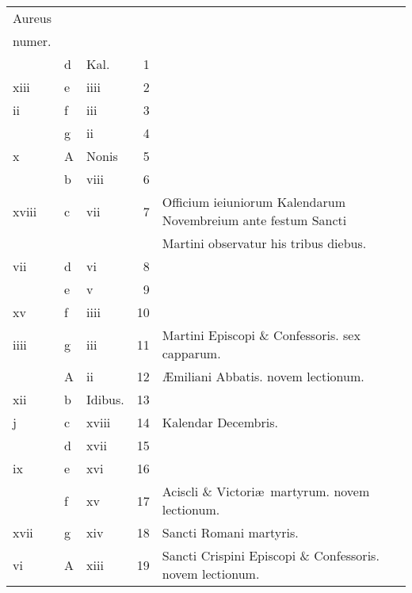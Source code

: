 \documentclass[11pt,openany]{book}
\begin{document}
\begin{center}
\begin{tabular}{l | l | l | r | l r}
\color{Red}Aureus & & & & \color{Red} \\
\color{Red}numer. & & & & \color{Red} \\
\color{Red}  & d & \color{Red} Kal. & 1 & & \color{Red} \\
\color{Red} xiii & e & \color{Red} iiii & 2 & & \color{Red} \\
\color{Red} ii & f & \color{Red} iii & 3 & & \color{Red} \\
\color{Red}  & g & \color{Red} ii & 4 & & \color{Red} \\
\color{Red} x & \color{Red} A & Nonis & 5 & & \color{Red} \\
\color{Red}  & b & \color{Red} viii & 6 & & \color{Red} \\
\color{Red} xviii & c & \color{Red} vii & 7 & Officium ieiuniorum Kalendarum Novembreium ante festum Sancti & \color{Red} \\
\color{Red}  &  &  &  & \quad Martini observatur his tribus diebus. & \color{Red} \\
\color{Red} vii & d & \color{Red} vi & 8 & & \color{Red} \\
\color{Red}  & e & \color{Red} v & 9 & & \color{Red} \\
\color{Red} xv & f & \color{Red} iiii & 10 & & \color{Red} \\
\color{Red} iiii & g & \color{Red} iii & 11 & Martini Episcopi \& Confessoris. \color{Red} sex capparum. & \color{Red} \\
\color{Red}  & \color{Red} A & \color{Red} ii & 12 & \AE miliani Abbatis. \color{Red} novem lectionum. & \color{Red} \\
\color{Red} xii & b & Idibus. & 13 & & \color{Red} \\
\color{Red} j & c & \color{Red} xviii & 14 & \qquad Kalendar Decembris. & \color{Red} \\
\color{Red}  & d & \color{Red} xvii & 15 & & \color{Red} \\
\color{Red} ix & e & \color{Red} xvi & 16 & & \color{Red} \\
\color{Red}  & f & \color{Red} xv & 17 & Aciscli \& Victori\ae \ martyrum. \color{Red} novem lectionum. & \color{Red} \\
\color{Red} xvii & g & \color{Red} xiv & 18 & Sancti Romani martyris. & \color{Red} \\
\color{Red} vi & \color{Red} A & \color{Red} xiii & 19 & Sancti Crispini Episcopi \& Confessoris. \color{Red} novem lectionum. & \color{Red} \\

\end{tabular}
\end{center}
\end{document}
